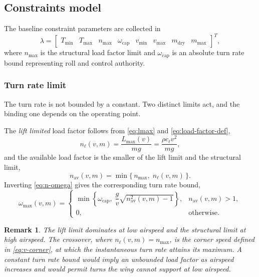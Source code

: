 \documentclass[11pt,a4paper]{article}
\newtheorem{remark}{Remark}
\newcommand{\veclambda}{\lambda}
\begin{document}
\subsection{Constraints model}

The baseline constraint parameters are collected in
\begin{equation}
  \veclambda = \begin{bmatrix}
    T_{\min} & T_{\max} & n_{\max} & \omega_{\mathrm{cap}} &
    v_{\min} & v_{\max} & m_{\mathrm{dry}} & m_{\max}
  \end{bmatrix}^{T},
  \label{eq:lambda}
\end{equation}
where $n_{\max}$ is the structural load factor limit and $\omega_{\mathrm{cap}}$
is an absolute turn rate bound representing roll and control authority.

\subsubsection{Turn rate limit}

The turn rate is not bounded by a constant. Two distinct limits act, and the
binding one depends on the operating point.

The \emph{lift limited} load factor follows from \cref{eq:lmax} and
\cref{eq:load-factor-def},
\begin{equation}
  n_\ell(v, m) = \frac{L_{\max}(v)}{mg} = \frac{\rho c_\ell v^{2}}{mg},
  \label{eq:n-lift}
\end{equation}
and the available load factor is the smaller of the lift limit and the
structural limit,
\begin{equation}
  n_{\mathrm{av}}(v, m) = \min\{\, n_{\max},\; n_\ell(v, m) \,\}.
  \label{eq:n-available}
\end{equation}
Inverting \cref{eq:n-omega} gives the corresponding turn rate bound,
\begin{equation}
  \omega_{\max}(v, m) =
  \begin{cases}
    \min\left\{ \omega_{\mathrm{cap}},\;
      \dfrac{g}{v}\sqrt{n_{\mathrm{av}}^{2}(v,m) - 1} \right\},
      & n_{\mathrm{av}}(v,m) > 1, \\[10pt]
    0, & \text{otherwise.}
  \end{cases}
  \label{eq:omega-max}
\end{equation}

\begin{remark}
The lift limit dominates at low airspeed and the structural limit at high
airspeed. The crossover, where $n_\ell(v,m) = n_{\max}$, is the corner speed
defined in \cref{eq:v-corner}, at which the instantaneous turn rate attains its
maximum. A constant turn rate bound would imply an unbounded load factor as
airspeed increases and would permit turns the wing cannot support at low
airspeed.
\end{remark}
\end{document}
